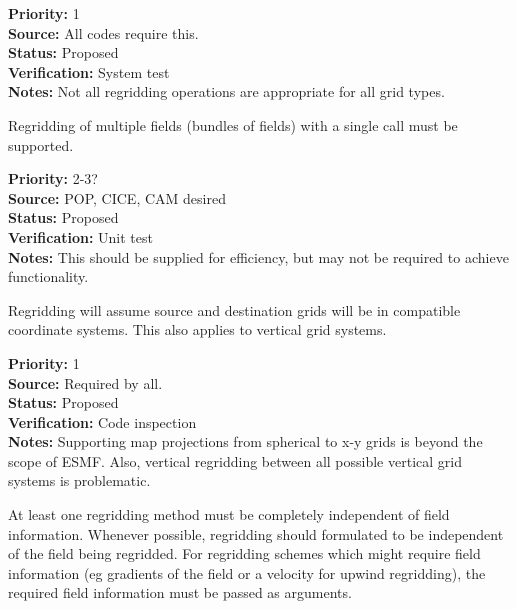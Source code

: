 \begin{reqlist}
{\bf Priority:} 1 \\
{\bf Source:} All codes require this. \\
{\bf Status:} Proposed \\
{\bf Verification:} System test \\
{\bf Notes:} Not all regridding operations are appropriate for all
             grid types.
\end{reqlist}


Regridding of multiple fields (bundles of fields) with
a single call must be supported.

\begin{reqlist}
{\bf Priority:} 2-3? \\
{\bf Source:} POP, CICE, CAM desired \\
{\bf Status:} Proposed \\
{\bf Verification:} Unit test \\
{\bf Notes:} This should be supplied for efficiency, but may not
             be required to achieve functionality.
\end{reqlist}


Regridding will assume source and destination grids will be
in compatible coordinate systems.  This also applies to vertical
grid systems.

\begin{reqlist}
{\bf Priority:} 1 \\
{\bf Source:} Required by all. \\
{\bf Status:} Proposed \\
{\bf Verification:} Code inspection  \\
{\bf Notes:} Supporting map projections from spherical to x-y grids is
             beyond the scope of ESMF.  Also, vertical regridding
             between all possible vertical grid systems is problematic.
\end{reqlist}


At least one regridding method must be completely independent of
field information.  Whenever possible, regridding should formulated to be 
independent of the field being regridded.  For regridding schemes which might 
require field information (eg gradients of the field or a velocity for 
upwind regridding), the required field information must be passed as arguments.

